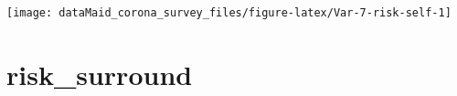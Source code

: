 \documentclass[
]{report}
\begin{document}
\begin{minipage}{0.75 \textwidth}
\end{minipage}
\begin{minipage}{0.25 \textwidth}

\begin{center}\texttt{[image: dataMaid\_corona\_survey\_files/figure-latex/Var-7-risk-self-1]} \end{center}

\end{minipage}

\noindent\makebox[\linewidth]{\rule{\textwidth}{0.4pt}}

\hypertarget{risk_surround}{%
\section{risk\_surround}\label{risk_surround}}
\end{document}
